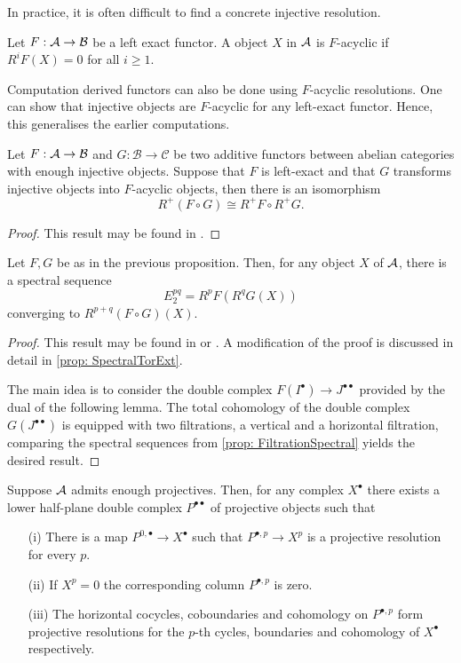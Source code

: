 In practice, it is often difficult to find a concrete injective resolution.
\begin{definition}
 Let $F:\AA \to \mathcal{B}$ be a left exact functor.
 A object $X$ in $\AA$ is $F$-acyclic if $R^iF(X) = 0$ for all $i\geq 1$.
\end{definition}
Computation derived functors can also be done using $F$-acyclic resolutions.
One can show that injective objects are $F$-acyclic for any left-exact functor.
Hence, this generalises the earlier computations.
\begin{proposition}\label{prop: GrothendieckIsomorphism}
  Let $F:\AA \to \mathcal{B}$ and $G:\mathcal{B}\to \mathcal{C}$ be two additive functors between abelian categories with enough injective objects. Suppose that $F$ is left-exact and that $G$ transforms injective objects into $F$-acyclic objects, then there is an isomorphism
  $$R^+(F\circ G) \cong R^+F \circ R^+ G.$$
\end{proposition}
\begin{proof}
  This result may be found in \cite[Chapter 1]{dimca2004sheaves}.
\end{proof}
\begin{theorem}
  Let $F,G$ be as in the previous proposition. Then, for any object $X$ of $\AA$, there is a spectral sequence
  $$E_2^{pq} = R^pF(R^qG(X)) $$
  converging to $R^{p+q}(F\circ G)(X).$
\end{theorem}
\begin{proof}
  This result may be found in \cite[Chapter 1]{dimca2004sheaves}  or \cite[Chapter 5]{weibel1995introduction}.
  A modification of the proof is discussed in detail in \cref{prop: SpectralTorExt}.

  The main idea is to consider the double complex $F(I^\bullet)\to J^{\bullet\bullet}$ provided by the dual of the following lemma.
  The total cohomology of the double complex $G(J^{\bullet\bullet})$ is equipped with two filtrations, a vertical and a horizontal filtration, comparing the spectral sequences from \cref{prop: FiltrationSpectral} yields the desired result.
\end{proof}
\begin{lemma}\label{lem: Cartan-Eilenberg}
  Suppose $\AA$ admits enough projectives. Then, for any complex $X^\bullet$ there exists a lower half-plane double complex $P^{\bullet\bullet}$ of projective objects such that
  \begin{enumerate}
    \item[(i)] There is a map $P^{0,\bullet}\to X^\bullet$ such that $P^{\bullet,p}\to X^{p}$ is a projective resolution for every $p$.
    \item[(ii)] If $X^p = 0$ the corresponding column $P^{\bullet,p}$ is zero.
    \item[(iii)] The horizontal cocycles, coboundaries and cohomology on $P^{\bullet,p}$ form projective resolutions for the $p$-th cycles, boundaries and cohomology of $X^\bullet$ respectively.
  \end{enumerate}
\end{lemma}
